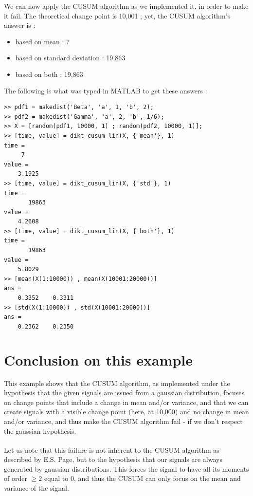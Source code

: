 \documentclass[french]{article}
\begin{document}
We can now apply the CUSUM algorithm as we implemented it, in order to make it fail. The theoretical change point is 10,001 ; yet, the CUSUM algorithm's answer is :
\begin{itemize}
	\item based on mean : 7
	\item based on standard deviation : 19,863
	\item based on both : 19,863
\end{itemize}

The following is what was typed in MATLAB to get these answers :

\begin{verbatim}
>> pdf1 = makedist('Beta', 'a', 1, 'b', 2);
>> pdf2 = makedist('Gamma', 'a', 2, 'b', 1/6);
>> X = [random(pdf1, 10000, 1) ; random(pdf2, 10000, 1)];
>> [time, value] = dikt_cusum_lin(X, {'mean'}, 1)
time =
     7
value =
    3.1925
>> [time, value] = dikt_cusum_lin(X, {'std'}, 1)
time =
       19863
value =
    4.2608
>> [time, value] = dikt_cusum_lin(X, {'both'}, 1)
time =
       19863
value =
    5.8029
>> [mean(X(1:10000)) , mean(X(10001:20000))]
ans =
    0.3352    0.3311
>> [std(X(1:10000)) , std(X(10001:20000))]
ans =
    0.2362    0.2350
\end{verbatim}

\section{Conclusion on this example}
This example shows that the CUSUM algorithm, as implemented under the hypothesis that the given signals are issued from a gaussian distribution, focuses on change points that include a change in mean and/or variance, and that we can create signals with a visible change point (here, at 10,000) and no change in mean and/or variance, and thus make the CUSUM algorithm fail - if we don't respect the gaussian hypothesis.
\\ \\
Let us note that this failure is not inherent to the CUSUM algorithm as described by E.S. Page, but to the hypothesis that our signals are always generated by gaussian distributions. This forces the signal to have all its moments of order $\geq 2$ equal to 0, and thus the CUSUM can only focus on the mean and variance of the signal.
\end{document}
